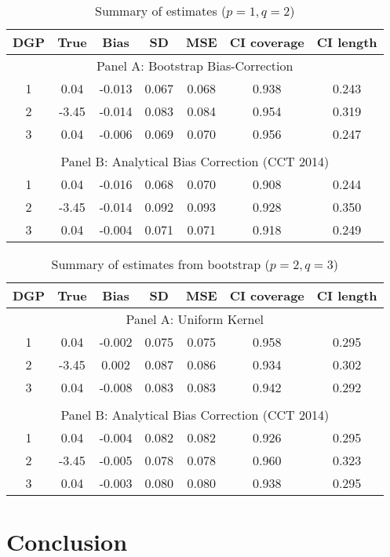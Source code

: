 \documentclass[12pt,fleqn]{article}
\begin{document}
\begin{table}[ht] \label{Tb1}
	\caption{Summary of estimates ($p = 1, q = 2$)}
	\centering
	\begin{tabular}{ccccccc}
		\hline
		DGP & True & Bias & SD & MSE & CI coverage & CI length \\ 
		\hline
		\multicolumn{7}{c}{Panel A: Bootstrap Bias-Correction} \\
		1 & 0.04 & -0.013 & 0.067 & 0.068 & 0.938 & 0.243 \\ 
		2 & -3.45 & -0.014 & 0.083 & 0.084 & 0.954 & 0.319 \\ 
		3 & 0.04 & -0.006 & 0.069 & 0.070 & 0.956 & 0.247 \\ 
		&&&&&& \\
		\multicolumn{7}{c}{Panel B: Analytical Bias Correction (CCT 2014)} \\
		1 & 0.04 & -0.016 & 0.068 & 0.070 & 0.908 & 0.244 \\ 
		2 & -3.45 & -0.014 & 0.092 & 0.093 & 0.928 & 0.350 \\ 
		3 & 0.04 & -0.004 & 0.071 & 0.071 & 0.918 & 0.249 \\ 
		\hline
	\end{tabular}
\end{table}

\begin{table}[ht]\label{Tb2}
	\caption{Summary of estimates from bootstrap ($p = 2, q = 3$)}
	\centering
	\begin{tabular}{ccccccc}
		\hline
		DGP & True & Bias & SD & MSE & CI coverage & CI length \\ 
		\hline
		\multicolumn{7}{c}{Panel A: Uniform Kernel} \\
		1 & 0.04 & -0.002 & 0.075 & 0.075 & 0.958 & 0.295 \\ 
		2 & -3.45 & 0.002 & 0.087 & 0.086 & 0.934 & 0.302 \\ 
		3 & 0.04 & -0.008 & 0.083 & 0.083 & 0.942 & 0.292 \\ 
		&&&&&& \\
		\multicolumn{7}{c}{Panel B: Analytical Bias Correction (CCT 2014)} \\
		1 & 0.04 & -0.004 & 0.082 & 0.082 & 0.926 & 0.295 \\ 		
		2 & -3.45 & -0.005 & 0.078 & 0.078 & 0.960 & 0.323 \\ 		
		3 & 0.04 & -0.003 & 0.080 & 0.080 & 0.938 & 0.295 \\ 
		\hline
	\end{tabular}
\end{table}

\section{Conclusion}\label{conclusion}
\end{document}
